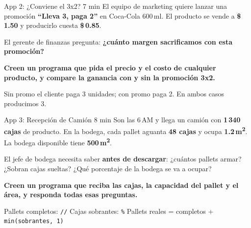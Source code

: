 \documentclass[aspectratio=169, 11pt]{beamer}
\begin{document}
\begin{frame}[fragile]{App 2: ¿Conviene el 3x2? \hfill {\normalsize\color{arcaRed}\faClock\hspace{4pt}7 min}}
  \vspace{-6pt}
  {\small\color{arcaDark}
    El equipo de marketing quiere lanzar una promoción
    \textbf{``Lleva 3, paga 2''} en Coca-Cola 600\,ml.
    El producto se vende a \textbf{\$\,1.50} y producirlo
    cuesta \textbf{\$\,0.85}.}

  \vspace{4pt}
  {\small\color{arcaDark}
    El gerente de finanzas pregunta:
    \textbf{¿cuánto margen sacrificamos con esta promoción?}}

  \vspace{6pt}
  {\small\color{arcaDark}\bfseries
    Creen un programa que pida el precio y el costo de cualquier
    producto, y compare la ganancia con y sin la promoción 3x2.}

  \vspace{6pt}
  {\scriptsize\color{textMuted}
    \faLightbulb[regular]\hspace{4pt}%
    Sin promo el cliente paga 3 unidades; con promo paga 2.
    En ambos casos producimos 3.}
\end{frame}

\begin{frame}[fragile]{App 3: Recepción de Camión \hfill {\normalsize\color{arcaRed}\faClock\hspace{4pt}8 min}}
  \vspace{-6pt}
  {\small\color{arcaDark}
    Son las 6\,AM y llega un camión con \textbf{1\,340 cajas} de producto.
    En la bodega, cada pallet aguanta \textbf{48 cajas} y
    ocupa \textbf{1.2\,m\textsuperscript{2}}.
    La bodega disponible tiene \textbf{500\,m\textsuperscript{2}}.}

  \vspace{4pt}
  {\small\color{arcaDark}
    El jefe de bodega necesita saber \textbf{antes de descargar}:
    ¿cuántos pallets armar? ¿Sobran cajas sueltas?
    ¿Qué porcentaje de la bodega se va a ocupar?}

  \vspace{6pt}
  {\small\color{arcaDark}\bfseries
    Creen un programa que reciba las cajas, la capacidad del
    pallet y el área, y responda todas esas preguntas.}

  \vspace{6pt}
  {\scriptsize\color{textMuted}
    \faLightbulb[regular]\hspace{4pt}%
    Pallets completos: \texttt{//} \quad
    Cajas sobrantes: \texttt{\%} \quad
    Pallets reales = completos + \texttt{min(sobrantes, 1)}}
\end{frame}
\end{document}
